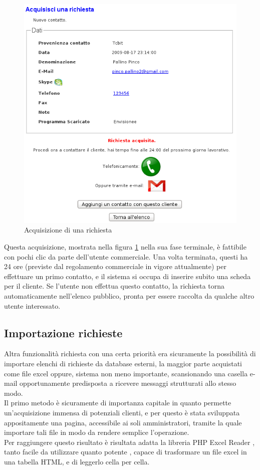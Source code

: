 \begin{figure}[!ht]
\centering
  \includegraphics[scale=0.65]{./images/acquisisciScreen.png}
\caption{Acquisizione di una richiesta}
\label{acq_richieste}
\end{figure}


\newpage
\noindent
Questa acquisizione, mostrata nella figura \ref{acq_richieste} nella sua fase terminale, \`e fattibile con pochi clic da parte dell'utente commerciale. Una volta terminata, questi ha 24 ore (previste dal regolamento commerciale in vigore attualmente) per effettuare un primo contatto, e il sistema si occupa di inserire subito una scheda per il cliente. Se l'utente non effettua questo contatto, la richiesta torna automaticamente nell'elenco pubblico, pronta per essere raccolta da qualche altro utente interessato.


\newpage
\subsection{Importazione richieste}
Altra funzionalit\`a richiesta con una certa priorit\`a era sicuramente la possibilit\`a di importare elenchi di richieste da database esterni, la maggior parte acquistati come file excel oppure, sistema non meno importante, scansionando una casella e-mail opportunamente predisposta a ricevere messaggi strutturati allo stesso modo.\\
Il primo metodo \`e sicuramente di importanza capitale in quanto permette un'acquisizione immensa di potenziali clienti, e per questo \`e stata sviluppata appositamente una pagina, accessibile ai soli amministratori, tramite la quale importare tali file in modo da rendere semplice l'operazione. \\
Per raggiungere questo risultato \`e risultata adatta la libreria PHP Excel Reader \cite{excel reader}, tanto facile da utilizzare quanto potente \cite{cinque}, capace di trasformare un file excel in una tabella HTML, e di leggerlo cella per cella.

